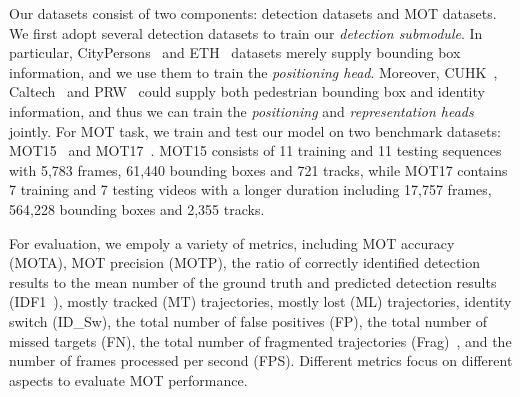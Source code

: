 \documentclass[acmsmall]{acmart}
\begin{document}
{
Our datasets consist of two components: detection datasets and MOT datasets.
We first adopt several detection datasets to} train our \emph{detection submodule}. 
In particular, CityPersons~\cite{zhang2017citypersons} and ETH~\cite{ess2008mobile} datasets merely supply bounding box information, 
and we use them to train the \emph{positioning head}. 
{Moreover, }CUHK~\cite{xiao2017joint}, Caltech~\cite{dollar2009pedestrian} and PRW~\cite{zheng2017person} could supply both pedestrian bounding box and identity information,
and thus we can train the \emph{positioning} and \emph{representation heads} jointly. 
For MOT task, we train and test our model on two benchmark datasets: MOT15~\cite{taix2015motchallenge} and MOT17~\cite{dendorfer2019cvpr19}. 
{MOT15 consists of 11 training and 11 testing sequences with 5,783 frames, 61,440 bounding boxes and 721 tracks, 
while MOT17 contains 7 training and 7 testing videos with a longer duration including 17,757 frames, 564,228 bounding boxes and 2,355 tracks.}

{For evaluation, we empoly a variety of metrics, including MOT accuracy (MOTA), MOT precision (MOTP), the ratio of correctly identified detection results to the mean number of the ground truth and predicted detection results (IDF1~\cite{ristani2016performance}), mostly tracked (MT) trajectories, mostly lost (ML) trajectories, identity switch (ID\_Sw), the total number of false positives (FP), the total number of missed targets (FN), the total number of fragmented trajectories (Frag)~\cite{clear}, and the number of frames processed per second (FPS).
Different metrics focus on different aspects to evaluate MOT performance.
}
\end{document}
